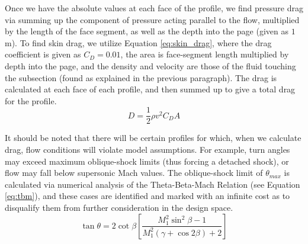 \documentclass[11pt]{article}
\begin{document}
Once we have the absolute values at each face of the profile, we find pressure drag via summing up the component of pressure acting parallel to the flow, multiplied by the length of the face segment, as well as the depth into the page (given as $1$ m). To find skin drag, we utilize Equation \ref{eq:skin_drag}, where the drag coefficient is given as $C_D=0.01$, the area is face-segment length multiplied by depth into the page, and the 
density and velocity are those of the fluid touching the subsection (found as explained in the previous paragraph). The drag is calculated at each face of each profile, and then summed up to give a total drag for the profile.
\begin{equation}
    D=\frac{1}{2} \rho v^2 C_D A 
    \label{eq:skin_drag}
\end{equation} 

It should be noted that there will be certain profiles for which, when we calculate drag, flow conditions will violate model assumptions. For example, turn angles may exceed maximum oblique-shock limits (thus forcing a detached shock), or flow may fall below supersonic Mach values. The oblique-shock limit of $\theta_{max}$ is calculated via numerical analysis of the Theta-Beta-Mach Relation (see Equation \ref{eq:tbm}), and these cases are identified and marked with an infinite cost as to disqualify them from further consideration in the design space.
\begin{equation}
\tan \theta = 2 \cot \beta 
\left[
\frac{M_1^2 \sin^2 \beta - 1}
     {M_1^2 (\gamma + \cos 2\beta) + 2}
\right]
\label{eq:tbm}
\end{equation}
\end{document}
